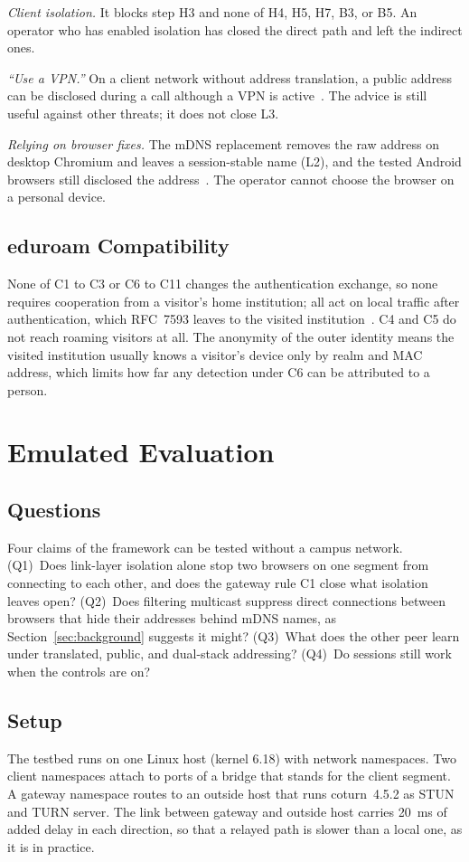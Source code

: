 \documentclass[conference]{IEEEtran}
\begin{document}
\textit{Client isolation.} It blocks step H3 and none of H4, H5, H7, B3, or B5. An operator who has enabled isolation has closed the direct path and left the indirect ones.

\textit{``Use a VPN.''} On a client network without address translation, a public address can be disclosed during a call although a VPN is active~\cite{nibert2025}. The advice is still useful against other threats; it does not close L3.

\textit{Relying on browser fixes.} The mDNS replacement removes the raw address on desktop Chromium and leaves a session-stable name (L2), and the tested Android browsers still disclosed the address~\cite{koysha2025}. The operator cannot choose the browser on a personal device.

\subsection{eduroam Compatibility}
None of C1 to C3 or C6 to C11 changes the authentication exchange, so none requires cooperation from a visitor's home institution; all act on local traffic after authentication, which RFC~7593 leaves to the visited institution~\cite{rfc7593}. C4 and C5 do not reach roaming visitors at all. The anonymity of the outer identity means the visited institution usually knows a visitor's device only by realm and MAC address, which limits how far any detection under C6 can be attributed to a person.

\section{Emulated Evaluation}
\label{sec:eval}
\subsection{Questions}
Four claims of the framework can be tested without a campus network. (Q1)~Does link-layer isolation alone stop two browsers on one segment from connecting to each other, and does the gateway rule C1 close what isolation leaves open? (Q2)~Does filtering multicast suppress direct connections between browsers that hide their addresses behind mDNS names, as Section~\ref{sec:background} suggests it might? (Q3)~What does the other peer learn under translated, public, and dual-stack addressing? (Q4)~Do sessions still work when the controls are on?

\subsection{Setup}
The testbed runs on one Linux host (kernel 6.18) with network namespaces. Two client namespaces attach to ports of a bridge that stands for the client segment. A gateway namespace routes to an outside host that runs coturn~4.5.2 as STUN and TURN server. The link between gateway and outside host carries 20~ms of added delay in each direction, so that a relayed path is slower than a local one, as it is in practice.
\end{document}
